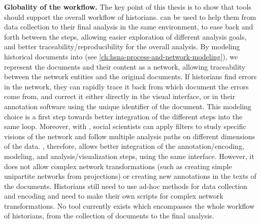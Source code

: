 \noindent\textbf{Globality of the \hsna workflow.} The key point of this thesis is to show that \va tools should support the overall \hsna workflow of historians.
\va can be used to help them from data collection to their final analysis in the same environment, to ease back and forth between the steps, allowing easier exploration of different analysis goals, and better traceability/reproducibility for the overall analysis.
By modeling historical documents into \modelplural (see \autoref{ch:hsna-process-and-network-modeling}), we represent the documents and their content as a network, allowing traceability between the network entities and the original documents.
If historians find errors in the network, they can rapidly trace it back from which document the errors come from, and correct it either directly in the visual interface, or in their annotation software using the unique identifier of the document.
This modeling choice is a first step towards better integration of the different steps into the same \va loop.
Moreover, with \combinet, social scientists can apply filters to study specific visions of the network and follow multiple analysis paths on different dimensions of the data.
\name, therefore, allows better integration of the annotation/encoding, modeling, and analysis/visualization steps, using the same interface.
However, it does not allow complex network transformations (such as creating simple unipartite networks from projections) or creating new annotations in the texts of the documents.
Historians still need to use ad-hoc methods for data collection and encoding and need to make their own scripts for complex network transformations.
No tool currently exists which encompasses the whole workflow of historians, from the collection of documents to the final analysis.







